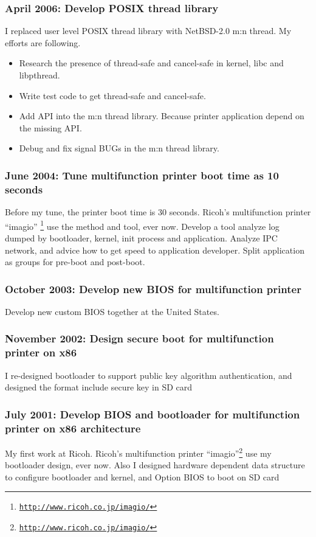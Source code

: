 \documentclass[letterpaper]{article}
\begin{document}
\subsubsection*{April 2006: Develop POSIX thread library}
I replaced user level POSIX thread library with NetBSD-2.0 m:n thread.
My efforts are following.
\begin{itemize}
  \item Research the presence of thread-safe and cancel-safe in kernel, libc and libpthread.
  \item Write test code to get thread-safe and cancel-safe.
  \item Add API into the m:n thread library. Because printer application depend on the missing API.
  \item Debug and fix signal BUGs in the m:n thread library.
\end{itemize}

\subsubsection*{June 2004: Tune multifunction printer boot time as 10 seconds}
Before my tune, the printer boot time is 30 seconds.
Ricoh's multifunction printer ``imagio''
\footnote{\href{http://www.ricoh.co.jp/imagio/}{\tt http://www.ricoh.co.jp/imagio/}}
use the method and tool, ever now.
Develop a tool analyze log dumped by bootloader, kernel, init process and application.
Analyze IPC network, and advice how to get speed to application developer.
Split application as groups for pre-boot and post-boot.

\subsubsection*{October 2003: Develop new BIOS for multifunction printer}
Develop new custom BIOS together at the United States.

\subsubsection*{November 2002: Design secure boot for multifunction printer on x86}
I re-designed bootloader to support public key algorithm authentication,
and designed the format include secure key in SD card

\subsubsection*{July 2001: Develop BIOS and bootloader for multifunction printer on x86 architecture}
My first work at Ricoh. Ricoh's multifunction printer
``imagio''\footnote{\href{http://www.ricoh.co.jp/imagio/}{\tt http://www.ricoh.co.jp/imagio/}}
use my bootloader design, ever now.
Also I designed hardware dependent data structure to configure bootloader and kernel,
and Option BIOS to boot on SD card
\end{document}
